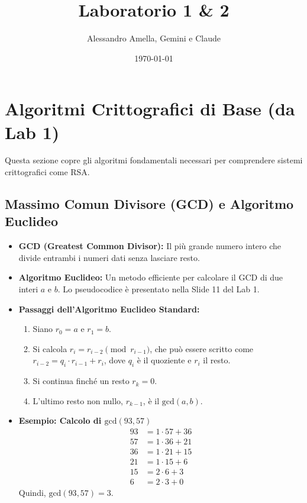 

\title{Laboratorio 1 \& 2}
\author{Alessandro Amella, Gemini e Claude}
\date{\today}



\maketitle
\tableofcontents
\newpage

\section{Algoritmi Crittografici di Base (da Lab 1)}
Questa sezione copre gli algoritmi fondamentali necessari per comprendere sistemi crittografici come RSA.

\subsection{Massimo Comun Divisore (GCD) e Algoritmo Euclideo}
\begin{itemize}
    \item \textbf{GCD (Greatest Common Divisor):} Il più grande numero intero che divide entrambi i numeri dati senza lasciare resto.
    \item \textbf{Algoritmo Euclideo:} Un metodo efficiente per calcolare il GCD di due interi \(a\) e \(b\). Lo pseudocodice è presentato nella Slide 11 del Lab 1.
    \item \textbf{Passaggi dell'Algoritmo Euclideo Standard:}
    \begin{enumerate}
        \item Siano \(r_0 = a\) e \(r_1 = b\).
        \item Si calcola \(r_i = r_{i-2} \pmod{r_{i-1}}\), che può essere scritto come \(r_{i-2} = q_i \cdot r_{i-1} + r_i\), dove \(q_i\) è il quoziente e \(r_i\) il resto.
        \item Si continua finché un resto \(r_k = 0\).
        \item L'ultimo resto non nullo, \(r_{k-1}\), è il \(\text{gcd}(a,b)\).
    \end{enumerate}
    \item \textbf{Esempio: Calcolo di \(\text{gcd}(93, 57)\)}
    \begin{align*}
        93 &= 1 \cdot 57 + 36 \\
        57 &= 1 \cdot 36 + 21 \\
        36 &= 1 \cdot 21 + 15 \\
        21 &= 1 \cdot 15 + 6 \\
        15 &= 2 \cdot 6 + 3 \\
        6 &= 2 \cdot 3 + 0
    \end{align*}
    Quindi, \(\text{gcd}(93, 57) = 3\).
\end{itemize}

